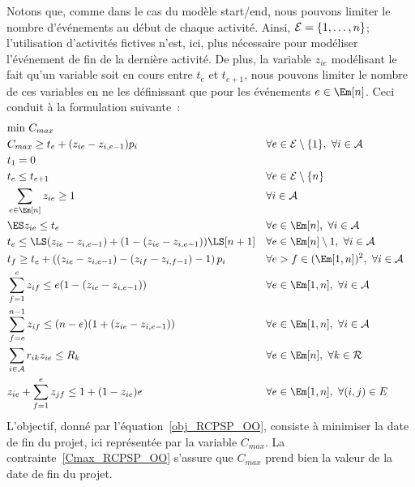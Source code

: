 Notons que, comme dans le cas du modèle start/end, nous pouvons
limiter le nombre d'événements au début de chaque activité. Ainsi,
${\cal E}=\{1,\dots,n\}$; l'utilisation d'activités fictives
n'est, ici, plus nécessaire pour modéliser l'événement de fin de
la dernière activité. De plus, la variable $z_{ie}$ modélisant le fait
qu'un variable soit en cours entre $t_e$ et $t_{e+1}$, nous pouvons
limiter le nombre de ces variables en ne les définissant que pour les
événements $e \in \Em[n]$. Ceci conduit à la formulation
suivante~\cite{modele_RCPSP}: {\small \begin{align} & \text{min } C_{max}
\label{obj_RCPSP_OO}\\ &C_{max} \ge t_e+ (z_{ie}-z_{i,e-1})p_i & &
\forall e \in {\cal E}\setminus\{1\},\ \forall i \in {\cal A}
\label{Cmax_RCPSP_OO}\\ &t_1=0 & & \label{t0_RCPSP_OO}\\ &t_e \le
t_{e+1} & &\forall e \in {\cal E}\setminus\{n\}
\label{ordre_RCPSP_OO}\\ &\sum_{e \in \Em[n]} z_{ie} \ge 1 & &
\forall i \in {\cal A} \label{start_RCPSP_OO}\\ & \ES z_{ie}\le
t_e & & \forall e \in \Em[n],\ \forall i \in {\cal A}
\label{ES_RCPSP_OO} \\ & t_e \le
\LS(z_{ie}-z_{i,e-1})+(1-(z_{ie}-z_{i,e-1}))\LS[n+1] & & \forall e
\in \Em[n]\setminus{1},\ \forall i \in {\cal A}
\label{LS_RCPSP_OO}\\ &t_f\ge t_e
+\left((z_{ie}-z_{i,e-1})-(z_{if}-z_{i,f-1})-1\right)p_i & & \forall
e>f \in (\Em[1,n])^2,\ \forall i \in {\cal
A}\label{dur_RCPSP_OO}\\ &\sum_{f=1}^{e} z_{if} \le
e(1-(z_{ie}-z_{i,e-1})) & & \forall e \in \Em[1,n],\
\forall i \in {\cal A}\label{preem1_RCPSP_OO}\\ &\sum_{f=e}^{n-1}
z_{if} \le (n-e)(1+(z_{ie}-z_{i,e-1})) & & \forall e \in \Em[1,n],\ 
\forall i \in {\cal A}\label{preem2_RCPSP_OO}\\
&\sum_{i \in {\cal A}} r_{ik}z_{ie} \le R_k & &\forall e \in \Em[n]
,\ \forall k \in {\cal R} \label{res_RCPSP_OO}\\
&z_{ie}+\sum_{f=1}^e z_{jf} \le 1 + (1-z_{ie})e & & \forall e \in
\Em[1,n],\ \forall (i,j) \in E \label{prec_RCPSP_OO}
\end{align}
}
L'objectif, donné par l'équation~\eqref{obj_RCPSP_OO}, 
consiste à minimiser la date de fin du projet, ici
représentée par la variable $C_{max}$. La
contrainte~\eqref{Cmax_RCPSP_OO} s'assure que $C_{max}$ prend bien
la valeur de la date de fin du projet.

